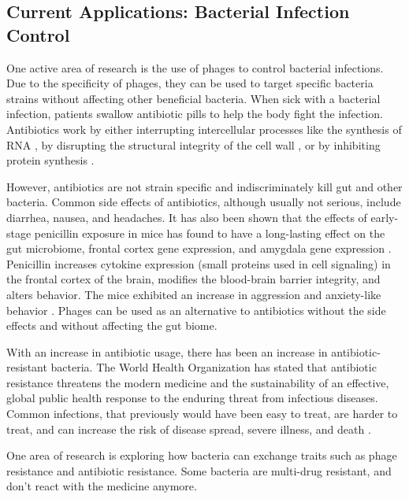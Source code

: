 \subsection{Current Applications: Bacterial Infection Control}
One active area of research is the use of phages to control bacterial infections.
Due to the specificity of phages, they can be used to target specific bacteria strains without affecting other beneficial bacteria.
When sick with a bacterial infection, patients swallow antibiotic pills to help the body fight the infection.
Antibiotics work by either interrupting intercellular processes like the synthesis of RNA \cite{flossRifamycinModeActionResistance2005}, by disrupting the structural integrity of the cell wall \cite{tomaszMechanismIrreversibleAntimicrobial1979}, or by inhibiting protein synthesis \cite{vakulenkoVersatilityAminoglycosidesProspects2003}.

However, antibiotics are not strain specific and indiscriminately kill gut and other bacteria.
Common side effects of antibiotics, although usually not serious, include diarrhea, nausea, and headaches.
It has also been shown that the effects of early-stage penicillin exposure in mice has found to have a long-lasting effect on the gut microbiome, frontal cortex gene expression, and amygdala gene expression \cite{volkovaEffectsEarlylifePenicillin2021}.
Penicillin increases cytokine expression (small proteins used in cell signaling) in the frontal cortex of the brain, modifies the blood-brain barrier integrity, and alters behavior.
The mice exhibited an increase in aggression and anxiety-like behavior \cite{leclercqLowdosePenicillinEarly2017}.
Phages can be used as an alternative to antibiotics without the side effects and without affecting the gut biome. 

With an increase in antibiotic usage, there has been an increase in antibiotic-resistant bacteria.
The World Health Organization has stated that antibiotic resistance threatens the modern medicine and the sustainability of an effective, global public health response to the enduring threat from infectious diseases.
Common infections, that previously would have been easy to treat, are harder to treat, and can increase the risk of disease spread, severe illness, and death \cite{GlobalActionPlan}. \newline

One area of research is exploring how bacteria can exchange traits such as phage resistance and antibiotic resistance.
Some bacteria are multi-drug resistant, and don't react with the medicine anymore.


